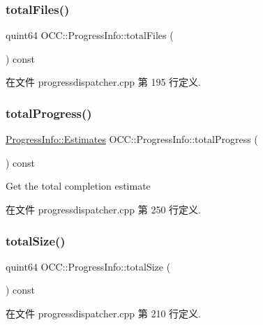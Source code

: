 \subsubsection{\texorpdfstring{total\+Files()}{totalFiles()}}
{\footnotesize\ttfamily quint64 O\+C\+C\+::\+Progress\+Info\+::total\+Files (\begin{DoxyParamCaption}{ }\end{DoxyParamCaption}) const}



在文件 progressdispatcher.\+cpp 第 195 行定义.

\mbox{\label{class_o_c_c_1_1_progress_info_a9fc28f468039ee22600235f5f7420d58}} 
\subsubsection{\texorpdfstring{total\+Progress()}{totalProgress()}}
{\footnotesize\ttfamily \hyperlink{struct_o_c_c_1_1_progress_info_1_1_estimates}{Progress\+Info\+::\+Estimates} O\+C\+C\+::\+Progress\+Info\+::total\+Progress (\begin{DoxyParamCaption}{ }\end{DoxyParamCaption}) const}

Get the total completion estimate 

在文件 progressdispatcher.\+cpp 第 250 行定义.

\mbox{\label{class_o_c_c_1_1_progress_info_a02066747326053ca6f65fd0d5da0e49a}} 
\subsubsection{\texorpdfstring{total\+Size()}{totalSize()}}
{\footnotesize\ttfamily quint64 O\+C\+C\+::\+Progress\+Info\+::total\+Size (\begin{DoxyParamCaption}{ }\end{DoxyParamCaption}) const}



在文件 progressdispatcher.\+cpp 第 210 行定义.


